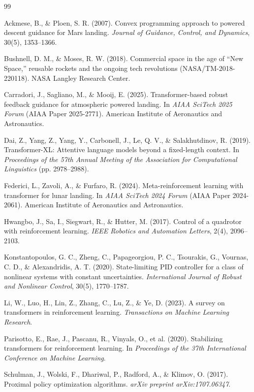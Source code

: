 \documentclass[10pt,twocolumn]{article}
\begin{document}
\begin{thebibliography}{99}

Ackmese, B., \& Ploen, S. R. (2007).
Convex programming approach to powered descent guidance for Mars landing.
\textit{Journal of Guidance, Control, and Dynamics}, 30(5), 1353--1366.

Bushnell, D. M., \& Moses, R. W. (2018).
Commercial space in the age of ``New Space,'' reusable rockets and the ongoing tech revolutions (NASA/TM-2018-220118).
NASA Langley Research Center.

Carradori, J., Sagliano, M., \& Mooij, E. (2025).
Transformer-based robust feedback guidance for atmospheric powered landing.
In \textit{AIAA SciTech 2025 Forum} (AIAA Paper 2025-2771).
American Institute of Aeronautics and Astronautics.

Dai, Z., Yang, Z., Yang, Y., Carbonell, J., Le, Q. V., \& Salakhutdinov, R. (2019).
Transformer-XL: Attentive language models beyond a fixed-length context.
In \textit{Proceedings of the 57th Annual Meeting of the Association for Computational Linguistics} (pp. 2978--2988).

Federici, L., Zavoli, A., \& Furfaro, R. (2024).
Meta-reinforcement learning with transformer for lunar landing.
In \textit{AIAA SciTech 2024 Forum} (AIAA Paper 2024-2061).
American Institute of Aeronautics and Astronautics.

Hwangbo, J., Sa, I., Siegwart, R., \& Hutter, M. (2017).
Control of a quadrotor with reinforcement learning.
\textit{IEEE Robotics and Automation Letters}, 2(4), 2096--2103.

Konstantopoulos, G. C., Zheng, C., Papageorgiou, P. C., Tsourakis, G., Vournas, C. D., \& Alexandridis, A. T. (2020).
State-limiting PID controller for a class of nonlinear systems with constant uncertainties.
\textit{International Journal of Robust and Nonlinear Control}, 30(5), 1770--1787.

Li, W., Luo, H., Lin, Z., Zhang, C., Lu, Z., \& Ye, D. (2023).
A survey on transformers in reinforcement learning.
\textit{Transactions on Machine Learning Research}.

Parisotto, E., Rae, J., Pascanu, R., Vinyals, O., et al. (2020).
Stabilizing transformers for reinforcement learning.
In \textit{Proceedings of the 37th International Conference on Machine Learning}.

Schulman, J., Wolski, F., Dhariwal, P., Radford, A., \& Klimov, O. (2017).
Proximal policy optimization algorithms.
\textit{arXiv preprint arXiv:1707.06347}.

\end{thebibliography}
\end{document}

